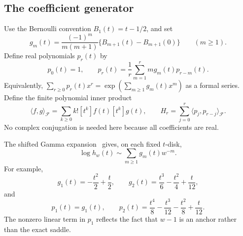 \documentclass[11pt,letterpaper]{article}
\numberwithin{equation}{section}
\theoremstyle{definition}\newtheorem{definition}[theorem]{Definition}
\theoremstyle{remark}\newtheorem{remark}[theorem]{Remark}
\begin{document}
\subsection{The coefficient generator}
Use the Bernoulli convention $B_1(t)=t-1/2$, and set
\begin{equation}\label{sfp:mc:eq:gm}
 g_m(t)=\frac{(-1)^m}{m(m+1)}
             \{B_{m+1}(t)-B_{m+1}(0)\}\qquad(m\geq1).
\end{equation}
Define real polynomials $p_r(t)$ by
\begin{equation}\label{sfp:mc:eq:pr}
 p_0(t)=1,\qquad
 p_r(t)=\frac1r\sum_{m=1}^{r}m g_m(t)p_{r-m}(t).
\end{equation}
Equivalently,
$\sum_{r\geq0}p_r(t)x^r=\exp(\sum_{m\geq1}g_m(t)x^m)$
as a formal series. Define the finite polynomial inner product
\begin{equation}\label{sfp:mc:eq:inner}
 \langle f,g\rangle_{\mathcal F}
 =\sum_{k\geq0}k![t^k]f(t)[t^k]g(t),\qquad
 H_r=\sum_{j=0}^{r}\langle p_j,p_{r-j}\rangle_{\mathcal F}.
\end{equation}
No complex conjugation is needed here because all coefficients
are real.

The shifted Gamma expansion~\cite[Eq.~5.11.8]{dlmf-mc} gives,
on each fixed $t$-disk,
\begin{equation}\label{sfp:mc:eq:loggammaexp}
 \log h_w(t)\sim\sum_{m\geq1}g_m(t)w^{-m}.
\end{equation}
For example,
\[
 g_1(t)=-\frac{t^2}{2}+\frac t2,\qquad
 g_2(t)=\frac{t^3}{6}-\frac{t^2}{4}+\frac t{12},
\]
and
\[
 p_1(t)=g_1(t),\qquad
 p_2(t)=\frac{t^4}{8}-\frac{t^3}{12}-\frac{t^2}{8}+\frac t{12}.
\]
The nonzero linear term in $p_1$ reflects the fact that $w-1$
is an anchor rather than the exact saddle.
\end{document}
